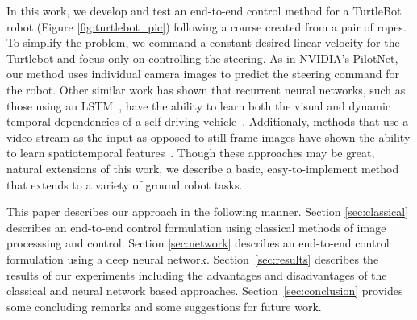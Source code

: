 In this work, we develop and test an end-to-end control method for a TurtleBot
robot (Figure \ref{fig:turtlebot_pic}) following a course created from a pair of
ropes. To simplify the problem, we command a constant desired linear velocity
for the Turtlebot and focus only on controlling the steering.
As in NVIDIA's PilotNet, our method uses
individual camera images to predict the steering command for the robot. Other
similar work has shown that recurrent neural networks, such as those using an
LSTM~\cite{xingjian2015convolutional}, have the ability to learn both the visual
and dynamic temporal dependencies of a self-driving vehicle~\cite{eraqi2017end}.
Additionaly, methods that use a video stream as the input as opposed to
still-frame images have shown the ability to learn spatiotemporal
features~\cite{tran2015learning}. Though these approaches may be great, natural
extensions of this work, we describe a basic, easy-to-implement method that
extends to a variety of ground robot tasks.

This paper describes our approach in the following manner. Section
\ref{sec:classical} describes an end-to-end control formulation using classical
methods of image processsing and control. Section \ref{sec:network} describes an
end-to-end control formulation using a deep neural network.
Section~\ref{sec:results} describes the results of our experiments including the
advantages and disadvantages of the classical and neural network based
approaches. Section~\ref{sec:conclusion} provides some concluding remarks and
some suggestions for future work.







